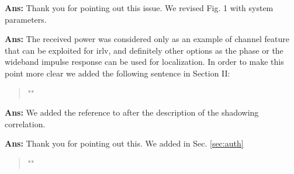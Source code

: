 \documentclass[draftcls,onecolumn,12pt]{IEEEtran}
\newcounter{revc}
\newcommand{\revp}[1]{\zref[revcontent]{#1}}
\begin{document}
\vspace{5mm} %
\begin{framed}
\end{framed}

{\bf Ans:} Thank you for pointing out this issue. We revised Fig. 1 with system parameters.

\vspace{5mm} %
\begin{framed}
\end{framed}

{\bf Ans:} The received power was considered only as an example of channel feature that can be exploited for \ac{irlv}, and definitely other options as the phase or the wideband impulse response can be used for localization. In order to make this point more clear we added the following sentence in Section II:
\begin{quote}
    "\revp{revPHASE}"
\end{quote}



\vspace{5mm} %
\begin{framed}
\end{framed}

{\bf Ans:} We added the reference to \cite[Chapter 2.7]{goldsmith2005} after the description of the shadowing correlation.

\vspace{5mm} %
\begin{framed}
\end{framed}

{\bf Ans:} Thank you for pointing out this. We added in Sec. \ref{sec:auth}
\begin{quote}
"\revp{lambda}"
\end{quote}

\vspace{5mm} %
\begin{framed}
\end{framed}
\end{document}
